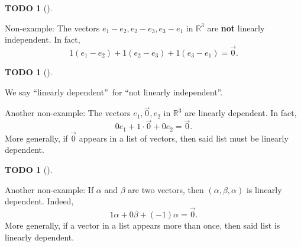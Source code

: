 \documentclass[numbers=enddot,12pt,final,onecolumn,notitlepage]{scrartcl}%
\theoremstyle{definition}
\newtheorem{quest}[theo]{TODO}
\newenvironment{todo}[1][]
{\begin{quest}[#1]\begin{leftbar}}
{\end{leftbar}\end{quest}}
\begin{document}
\begin{todo}
Non-example: The vectors $e_{1}-e_{2},e_{2}-e_{3},e_{3}-e_{1}$ in
$\mathbb{R}^{3}$ are \textbf{not} linearly independent. In fact,%
\[
1\left(  e_{1}-e_{2}\right)  +1\left(  e_{2}-e_{3}\right)  +1\left(
e_{3}-e_{1}\right)  =\overrightarrow{0}.
\]

\end{todo}



\begin{todo}
We say \textquotedblleft linearly dependent\textquotedblright\ for
\textquotedblleft not linearly independent\textquotedblright.



Another non-example: The vectors $e_{1},\overrightarrow{0},e_{2}$ in
$\mathbb{R}^{3}$ are linearly dependent. In fact,%
\[
0e_{1}+1\cdot\overrightarrow{0}+0e_{2}=\overrightarrow{0}.
\]
More generally, if $\overrightarrow{0}$ appears in a list of vectors, then
said list must be linearly dependent.
\end{todo}



\begin{todo}
Another non-example: If $\alpha$ and $\beta$ are two vectors, then $\left(
\alpha,\beta,\alpha\right)  $ is linearly dependent. Indeed,%
\[
1\alpha+0\beta+\left(  -1\right)  \alpha=\overrightarrow{0}.
\]
More generally, if a vector in a list appears more than once, then said list
is linearly dependent.
\end{todo}
\end{document}
